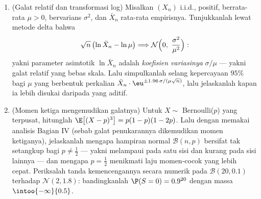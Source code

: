 \begin{problem}
\begin{enumerate}[resume]
  \item (Galat relatif dan transformasi log) Misalkan $(X_n)$
        i.i.d., positif, berrata-rata $\mu > 0$, bervarians
        $\sigma^2$, dan $\bar X_n$ rata-rata empirisnya. Tunjukkanlah
        lewat metode delta bahwa
        \[
        \sqrt n\,\bigl(\ln\bar X_n - \ln\mu\bigr)
        \Longrightarrow
        \mathcal N\Bigl(0,\ \frac{\sigma^2}{\mu^2}\Bigr) :
        \]
        yakni parameter asimtotik $\ln\bar X_n$ adalah
        \emph{koefisien variasinya} $\sigma/\mu$ ---
        yakni galat relatif yang bebas skala. Lalu simpulkanlah selang
        kepercayaan $95\%$ bagi $\mu$ yang berbentuk
        perkalian $\bar X_n\cdot\eu^{\pm1.96\,\sigma/(\mu\sqrt
        n)}$, lalu jelaskanlah kapan ia lebih disukai daripada
        yang aditif.
  \item (Momen ketiga mengemudikan galatnya) Untuk $X \sim$
        Bernoulli($p$) yang terpusat, hitunglah $\E\bigl[(X -
        p)^3\bigr] = p(1-p)(1-2p)$. Lalu dengan memakai analisis Bagian IV
        (sebab galat penukarannya dikemudikan momen ketiganya), jelaskanlah
        mengapa hampiran normal $\mathcal B(n, p)$
        bersifat tak setangkup bagi $p \neq \frac12$ --- yakni melampaui
        pada satu sisi dan kurang pada sisi lainnya --- dan mengapa
        $p = \frac12$ menikmati laju momen-cocok yang lebih cepat.
        Periksalah tanda kemencengannya secara numerik pada $\mathcal
        B(20, 0.1)$ terhadap $\mathcal N(2, 1.8)$: bandingkanlah
        $\P(S = 0) = 0.9^{20}$ dengan massa 
        $\intoo{-\infty}{0.5}$.

\end{enumerate}
\end{problem}
